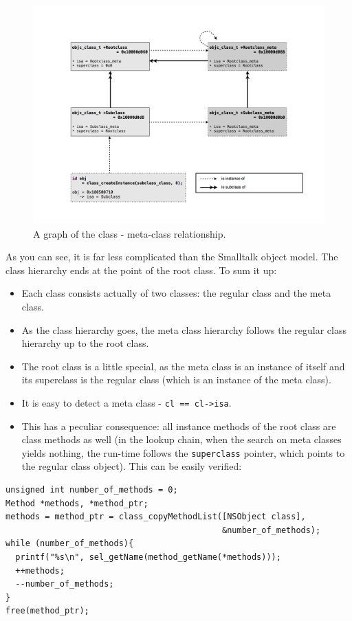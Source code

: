\begin{figure}[htbp] 
\includegraphics[width=\textwidth]{img/metaclass_graph.png}
  \centering{}
  \caption{A graph of the class - meta-class relationship.}
  \label{fig:class_metaclass_graph}
\end{figure}

As you can see, it is far less complicated than the Smalltalk object model. The class hierarchy ends at the point of the root class. To sum it up:

\begin{itemize}
\item Each class consists actually of two classes: the regular class and the meta class.
\item As the class hierarchy goes, the meta class hierarchy follows the regular class hierarchy up to the root class.
\item The root class is a little special, as the meta class is an instance of itself and its superclass is the regular class (which is an instance of the meta class).
\item It is easy to detect a meta class - \verb:cl == cl->isa:.
\item This has a peculiar consequence: all instance methods of the root class are class methods as well (in the lookup chain, when the search on meta classes yields nothing, the run-time follows the \verb=superclass= pointer, which points to the regular class object). This can be easily verified:
\end{itemize}

\begin{verbatim}
unsigned int number_of_methods = 0;
Method *methods, *method_ptr;
methods = method_ptr = class_copyMethodList([NSObject class], 
                                            &number_of_methods);
while (number_of_methods){
  printf("%s\n", sel_getName(method_getName(*methods)));
  ++methods;
  --number_of_methods;
}
free(method_ptr);
\end{verbatim}

